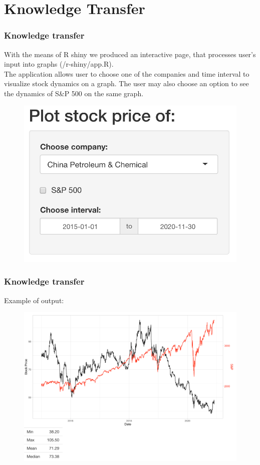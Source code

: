 \documentclass {beamer}
\begin{document}
\section{Knowledge Transfer}
\begin{frame}
\frametitle{Knowledge transfer}
With the means of R shiny we produced an interactive page, that processes user's input into graphs (/r-shiny/app.R).\\
The application allows user to choose one of the companies and time interval to visualize stock dynamics on a graph. The user may also choose an option to see the dynamics of S\&P 500 on the same graph.\\

\begin{figure}[!h]
\includegraphics[scale=0.25]{screenshot1}
\label{fig:ss1}
\end{figure}
\end{frame}


\begin{frame}
\frametitle{Knowledge transfer}
Example of output:

\begin{figure}[!h]
\includegraphics[scale=0.18]{screenshot2}
\label{fig:ss1}
\end{figure}
\end{frame}
\end{document}
